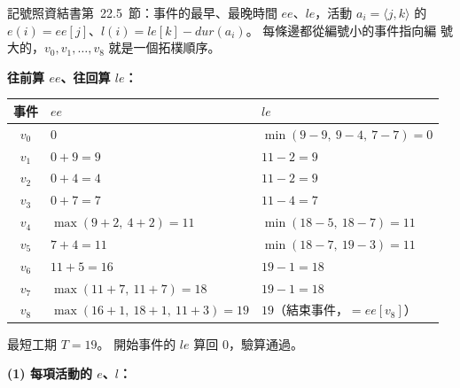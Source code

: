 \begin{pastsoln}
記號照資結書第~22.5~節：事件的最早、最晚時間 $\mathit{ee}$、$\mathit{le}$，活動 $a_i = \langle j, k
\rangle$ 的 $e(i) = \mathit{ee}[j]$、$l(i) = \mathit{le}[k] - \mathit{dur}(a_i)$。 每條邊都從編號小的事件指向編
號大的，$v_0, v_1, \ldots, v_8$ 就是一個拓樸順序。

\textbf{往前算 $\mathit{ee}$、往回算 $\mathit{le}$：}

\begin{center}
\small
\begin{tabular}{cll}
\toprule
事件 & $\mathit{ee}$ & $\mathit{le}$ \\
\midrule
$v_0$ & $0$ & $\min(9 - 9,\ 9 - 4,\ 7 - 7) = 0$ \\
$v_1$ & $0 + 9 = 9$ & $11 - 2 = 9$ \\
$v_2$ & $0 + 4 = 4$ & $11 - 2 = 9$ \\
$v_3$ & $0 + 7 = 7$ & $11 - 4 = 7$ \\
$v_4$ & $\max(9 + 2,\ 4 + 2) = 11$ & $\min(18 - 5,\ 18 - 7) = 11$ \\
$v_5$ & $7 + 4 = 11$ & $\min(18 - 7,\ 19 - 3) = 11$ \\
$v_6$ & $11 + 5 = 16$ & $19 - 1 = 18$ \\
$v_7$ & $\max(11 + 7,\ 11 + 7) = 18$ & $19 - 1 = 18$ \\
$v_8$ & $\max(16 + 1,\ 18 + 1,\ 11 + 3) = 19$ & $19$（結束事件，$= \mathit{ee}[v_8]$） \\
\bottomrule
\end{tabular}
\end{center}

最短工期 $T = 19$。 開始事件的 $\mathit{le}$ 算回 $0$，驗算通過。

\textbf{(1) 每項活動的 $e$、$l$：}


\end{pastsoln}
